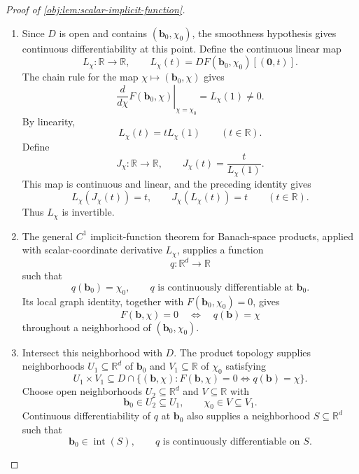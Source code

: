 \documentclass[11pt]{article}
\begin{document}
\begin{proof}[Proof of \cref{obj:lem:scalar-implicit-function}]
\begin{enumerate}
\item Since \(D\) is open and contains \((\mathbf b_0,\chi_0)\), the smoothness hypothesis gives continuous differentiability at this point. Define the continuous linear map
\[
L_\chi:\mathbb R\to\mathbb R,
\qquad
L_\chi(t)=DF(\mathbf b_0,\chi_0)[(\mathbf 0,t)].
\]
The chain rule for the map \(\chi\mapsto(\mathbf b_0,\chi)\) gives
\[
\left.\frac{d}{d\chi}F(\mathbf b_0,\chi)\right|_{\chi=\chi_0}
=L_\chi(1)\ne0.
\]
By linearity,
\[
L_\chi(t)=tL_\chi(1)
\qquad(t\in\mathbb R).
\]
Define
\[
J_\chi:\mathbb R\to\mathbb R,
\qquad
J_\chi(t)=\frac{t}{L_\chi(1)}.
\]
This map is continuous and linear, and the preceding identity gives
\[
L_\chi(J_\chi(t))=t,
\qquad
J_\chi(L_\chi(t))=t
\qquad(t\in\mathbb R).
\]
Thus \(L_\chi\) is invertible. %

\item The general \(C^1\) implicit-function theorem for Banach-space products, applied with scalar-coordinate derivative \(L_\chi\), supplies a function
\[
q:\mathbb R^d\to\mathbb R
\]
such that
\[
q(\mathbf b_0)=\chi_0,
\qquad
q\text{ is continuously differentiable at }\mathbf b_0.
\]
Its local graph identity, together with \(F(\mathbf b_0,\chi_0)=0\), gives
\[
F(\mathbf b,\chi)=0
\quad\Longleftrightarrow\quad
q(\mathbf b)=\chi
\]
throughout a neighborhood of \((\mathbf b_0,\chi_0)\). %

\item Intersect this neighborhood with \(D\). The product topology supplies neighborhoods \(U_1\subseteq\mathbb R^d\) of \(\mathbf b_0\) and \(V_1\subseteq\mathbb R\) of \(\chi_0\) satisfying
\[
U_1\times V_1
\subseteq
D\cap
\bigl\{(\mathbf b,\chi):
F(\mathbf b,\chi)=0
\Longleftrightarrow q(\mathbf b)=\chi\bigr\}.
\]
Choose open neighborhoods \(U_2\subseteq\mathbb R^d\) and \(V\subseteq\mathbb R\) with
\[
\mathbf b_0\in U_2\subseteq U_1,
\qquad
\chi_0\in V\subseteq V_1.
\]
Continuous differentiability of \(q\) at \(\mathbf b_0\) also supplies a neighborhood \(S\subseteq\mathbb R^d\) such that
\[
\mathbf b_0\in\operatorname{int}(S),
\qquad
q\text{ is continuously differentiable on }S.
\]


\end{enumerate}
\end{proof}
\end{document}
